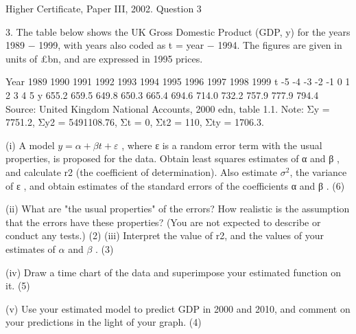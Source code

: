 \documentclass[a4paper,12pt]{article}
\begin{document}
Higher Certificate, Paper III, 2002. Question 3
\begin{framed}
3. The table below shows the UK Gross Domestic Product (GDP, y) for the years 1989 − 1999, with years also coded as t = year − 1994.  
The figures are given in units of £bn, and are expressed in 1995 prices. 
 
 
Year 1989 1990 1991 1992 1993 1994 1995 1996 1997 1998 1999 t -5 -4 -3 -2 -1 0 1 2 3 4 5 y 655.2 659.5 649.8 650.3 665.4 694.6 714.0 732.2 757.9 777.9 794.4 
 Source:  United Kingdom National Accounts, 2000 edn, table 1.1. 
 Note:    Σy = 7751.2,    Σy2 = 5491108.76,    Σt = 0,    Σt2 = 110,    Σty = 1706.3. 
 
 
 
(i) A model $y = \alpha + \beta t + \varepsilon$ , where ε is a random error term with the usual properties, is proposed for the data. 
 Obtain least squares estimates of α
 and β , and calculate r2 (the coefficient of determination).  Also estimate $\sigma^2$, the variance of ε , and obtain estimates of the standard errors of the coefficients α and β . (6) 
 
(ii) What are "the usual properties" of the errors?  How realistic is the assumption that the errors have these properties?  (You are not expected to describe or conduct any tests.) (2) 
 (iii) Interpret the value of r2, and the values of your estimates of $\alpha$ and $\beta$ . (3) 
 
(iv) Draw a time chart of the data and superimpose your estimated function on it. (5) 
 
(v) Use your estimated model to predict GDP in 2000 and 2010, and comment on your predictions in the light of your graph. (4) 
 
 
\end{framed}
\end{document}
